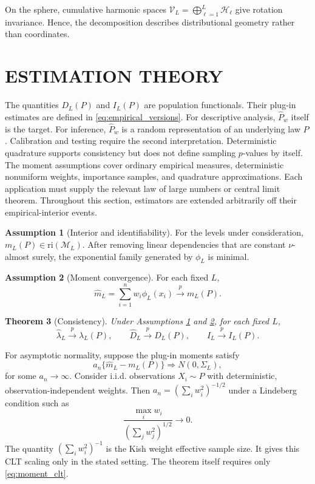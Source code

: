 \documentclass[twoside]{article}
\newtheorem{theorem}{Theorem}
\theoremstyle{definition}
\newtheorem{assumption}[theorem]{Assumption}
\theoremstyle{remark}
\newcommand{\M}{\mathcal M}
\newcommand{\V}{\mathcal V}
\newcommand{\ri}{\mathrm{ri}}
\begin{document}
On the sphere, cumulative harmonic spaces $\V_L=\bigoplus_{\ell=1}^L\mathcal H_\ell$ give rotation invariance. Hence, the decomposition describes distributional geometry rather than coordinates.

\section{ESTIMATION THEORY}

The quantities $D_L(P)$ and $I_L(P)$ are population functionals. Their plug-in estimates are defined in \eqref{eq:empirical_versions}. For descriptive analysis, $\widehat P_w$ itself is the target. For inference, $\widehat P_w$ is a random representation of an underlying law $P$. Calibration and testing require the second interpretation. Deterministic quadrature supports consistency but does not define sampling $p$-values by itself. The moment assumptions cover ordinary empirical measures, deterministic nonuniform weights, importance samples, and quadrature approximations. Each application must supply the relevant law of large numbers or central limit theorem. Throughout this section, estimators are extended arbitrarily off their empirical-interior events.

\begin{assumption}[Interior and identifiability]
\label{assump:interior}
For the levels under consideration, $m_L(P)\in\ri(\M_L)$. After removing linear dependencies that are constant $\nu$-almost surely, the exponential family generated by $\phi_L$ is minimal.
\end{assumption}

\begin{assumption}[Moment convergence]
\label{assump:moment_conv}
For each fixed $L$,
\[
  \widehat m_L=\sum_{i=1}^n w_i\phi_L(x_i)\xrightarrow{p}m_L(P).
\]
\end{assumption}




\begin{theorem}[Consistency]
\label{thm:consistency}
Under Assumptions \ref{assump:interior} and \ref{assump:moment_conv}, for each fixed $L$,
\[
  \widehat\lambda_L\xrightarrow{p}\lambda_L(P),\qquad
  \widehat D_L\xrightarrow{p}D_L(P),\qquad
  \widehat I_L\xrightarrow{p}I_L(P).
\]
\end{theorem}

For asymptotic normality, suppose the plug-in moments satisfy
\begin{equation}
  a_n\{\widehat m_L-m_L(P)\}\Rightarrow N(0,\Sigma_L),
  \label{eq:moment_clt}
\end{equation}
for some $a_n\to\infty$. Consider i.i.d. observations $X_i\sim P$ with deterministic, observation-independent weights. Then $a_n=(\sum_i w_i^2)^{-1/2}$ under a Lindeberg condition such as
\[
  \frac{\max_i w_i}{(\sum_j w_j^2)^{1/2}}\to 0.
\]
The quantity $(\sum_iw_i^2)^{-1}$ is the Kish weight effective sample size. It gives this CLT scaling only in the stated setting. The theorem itself requires only \eqref{eq:moment_clt}.
\end{document}
